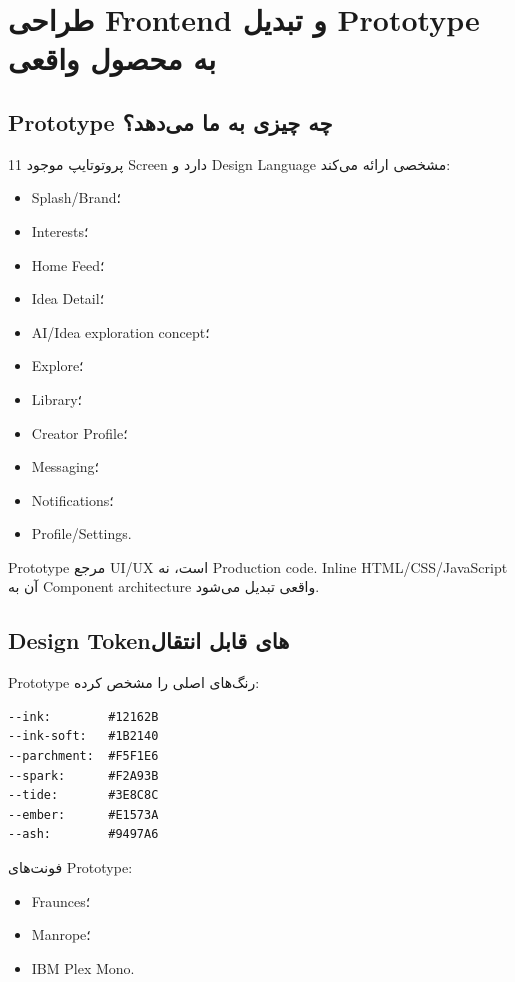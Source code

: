 
\chapter{طراحی Frontend و تبدیل Prototype به محصول واقعی}

\section{Prototype چه چیزی به ما می‌دهد؟}

پروتوتایپ موجود 11 Screen دارد و Design Language مشخصی ارائه می‌کند:
\begin{itemize}
  \item Splash/Brand؛
  \item Interests؛
  \item Home Feed؛
  \item Idea Detail؛
  \item AI/Idea exploration concept؛
  \item Explore؛
  \item Library؛
  \item Creator Profile؛
  \item Messaging؛
  \item Notifications؛
  \item Profile/Settings.
\end{itemize}

\begin{decisionbox}
Prototype مرجع UI/UX است، نه Production code. Inline HTML/CSS/JavaScript آن به Component architecture واقعی تبدیل می‌شود.
\end{decisionbox}

\section{Design Tokenهای قابل انتقال}

Prototype رنگ‌های اصلی را مشخص کرده:
\begin{latin}
\begin{lstlisting}
--ink:        #12162B
--ink-soft:   #1B2140
--parchment:  #F5F1E6
--spark:      #F2A93B
--tide:       #3E8C8C
--ember:      #E1573A
--ash:        #9497A6
\end{lstlisting}
\end{latin}

فونت‌های Prototype:
\begin{itemize}
  \item Fraunces؛
  \item Manrope؛
  \item IBM Plex Mono.
\end{itemize}

